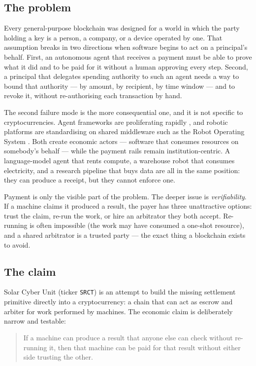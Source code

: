 \documentclass{article}
\begin{document}
\subsection{The problem}

Every general-purpose blockchain was designed for a world in which the party
holding a key is a person, a company, or a device operated by one. That
assumption breaks in two directions when software begins to act on a principal's
behalf. First, an autonomous agent that receives a payment must be able to prove
what it did and to be paid for it without a human approving every step. Second,
a principal that delegates spending authority to such an agent needs a way to
bound that authority --- by amount, by recipient, by time window --- and to
revoke it, without re-authorising each transaction by hand.

The second failure mode is the more consequential one, and it is not specific to
cryptocurrencies. Agent frameworks are proliferating rapidly \cite{sutton2019bitter,
yao2023survey,wang2023autogpt,yang2024sweagent}, and robotic platforms are
standardising on shared middleware such as the Robot Operating System
\cite{quan2021ros}. Both create economic actors --- software that consumes
resources on somebody's behalf --- while the payment rails remain
institution-centric. A language-model agent that rents compute, a warehouse
robot that consumes electricity, and a research pipeline that buys data are all
in the same position: they can produce a receipt, but they cannot enforce one.

Payment is only the visible part of the problem. The deeper issue is
\emph{verifiability}. If a machine claims it produced a result, the payer has
three unattractive options: trust the claim, re-run the work, or hire an
arbitrator they both accept. Re-running is often impossible (the work may have
consumed a one-shot resource), and a shared arbitrator is a trusted party --- the
exact thing a blockchain exists to avoid.

\subsection{The claim}

Solar Cyber Unit (ticker \texttt{SRCT}) is an attempt to build the missing settlement
primitive directly into a cryptocurrency: a chain that can act as escrow and
arbiter for work performed by machines. The economic claim is deliberately
narrow and testable:

\begin{quote}
If a machine can produce a result that anyone else can check without re-running
it, then that machine can be paid for that result without either side trusting
the other.
\end{quote}
\end{document}
